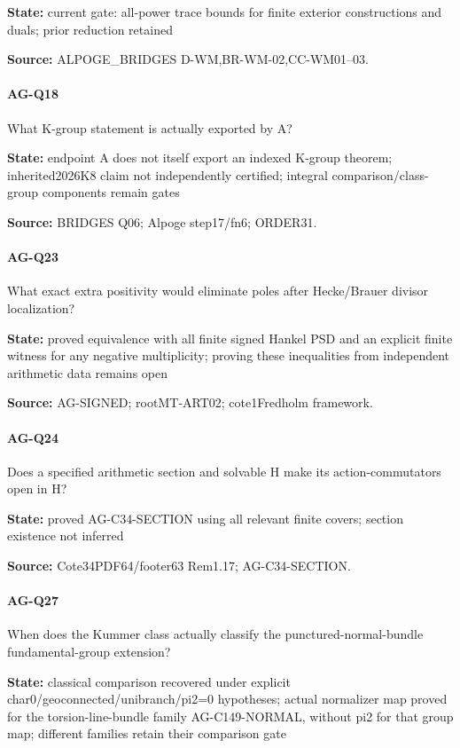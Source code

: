 \documentclass[11pt,a4paper]{article}
\begin{document}
\textbf{State:} current gate:\allowbreak{} all-power trace bounds for finite exterior constructions and duals; prior reduction retained

\textbf{Source:} ALPOGE\_\allowbreak{}BRIDGES D-WM,BR-WM-02,CC-WM01–\allowbreak{}03.

\paragraph{AG-Q18} What K-group statement is actually exported by A?

\textbf{State:} endpoint A does not itself export an indexed K-group theorem; inherited2026K8 claim not independently certified; integral comparison/\allowbreak{}class-group components remain gates

\textbf{Source:} BRIDGES Q06; Alpoge step17/\allowbreak{}fn6; ORDER31.

\paragraph{AG-Q23} What exact extra positivity would eliminate poles after Hecke/\allowbreak{}Brauer divisor localization?

\textbf{State:} proved equivalence with all finite signed Hankel PSD and an explicit finite witness for any negative multiplicity; proving these inequalities from independent arithmetic data remains open

\textbf{Source:} AG-SIGNED; rootMT-ART02; cote1Fredholm framework.

\paragraph{AG-Q24} Does a specified arithmetic section and solvable H make its action-commutators open in H?

\textbf{State:} proved AG-C34-SECTION using all relevant finite covers; section existence not inferred

\textbf{Source:} Cote34PDF64/\allowbreak{}footer63 Rem1.\allowbreak{}17; AG-C34-SECTION.

\paragraph{AG-Q27} When does the Kummer class actually classify the punctured-normal-bundle fundamental-group extension?

\textbf{State:} classical comparison recovered under explicit char0/\allowbreak{}geoconnected/\allowbreak{}unibranch/\allowbreak{}pi2=0 hypotheses; actual normalizer map proved for the torsion-line-bundle family AG-C149-NORMAL, without pi2 for that group map; different families retain their comparison gate
\end{document}
